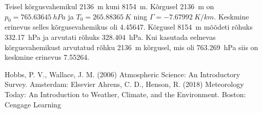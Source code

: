 \documentclass{trkut}%
\begin{document}
Teisel kõrgusvahemikul \SI{2136}{m} kuni \SI{8154}{m}. Kõrgusel \SI{2136}{m} on $p_0=\SI{765.63645}{hPa}$ ja $T_0 = \SI{265.88365}{K}$ ning $\Gamma = \SI{-7.67992}{K/km}$. Keskmine erinevus selles kõrgusevahemikus oli \SI{4.45647}{\permil}. Kõrgusel \SI{8154}{m} mõõdeti rõhuks \SI{332.17}{hPa} ja arvutati rõhuks \SI{328.404}{hPa}. Kui kasutada eelnevas kõrgusvahemikust arvutatud rõhku \SI{2136}{m} kõrgusel, mis oli \SI{763.269}{hPa} siis on keskmine erinevus \SI{7.55264}{\permil}.





Hobbs, P. V., Wallace, J. M. (2006) Atmospheric Science: An Introductory Survey. Amsterdam: Elsevier \newline
Ahrens, C. D., Henson, R. (2018) Meteorology Today: An Introduction to Weather, Climate, and the Environment. Boston: Cengage Learning




\kinnitusleht%
\end{document}
